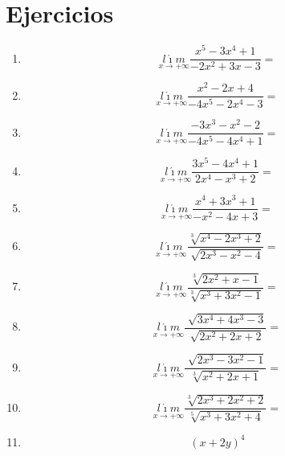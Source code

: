 \documentclass[oneside,spanish,letter]{article}
\begin{document}
\section{Ejercicios}
\begin{enumerate}
 \item $$\underset{x\rightarrow +\infty}{l\acute{\imath}m} \frac{x^5-3x^4+1}{-2x^2+3x-3}=$$
 \item $$\underset{x\rightarrow +\infty}{l\acute{\imath}m} \frac{x^2-2x+4}{-4x^5-2x^4-3}=$$
 \item $$\underset{x\rightarrow +\infty}{l\acute{\imath}m} \frac{-3x^3-x^2-2}{-4x^5-4x^4+1}=$$
 \item $$\underset{x\rightarrow +\infty}{l\acute{\imath}m} \frac{3x^5-4x^4+1}{2x^4-x^3+2}=$$
 \item $$\underset{x\rightarrow +\infty}{l\acute{\imath}m} \frac{x^4+3x^3+1}{-x^2-4x+3}=$$
 \item $$\underset{x\rightarrow +\infty}{l\acute{\imath}m} \frac{\sqrt[3]{x^4-2x^3+2}}{\sqrt[]{2x^3-x^2-4}}=$$
 \item $$\underset{x\rightarrow +\infty}{l\acute{\imath}m} \frac{\sqrt[3]{2x^2+x-1}}{\sqrt[3]{x^3+3x^2-1}}=$$
 \item $$\underset{x\rightarrow +\infty}{l\acute{\imath}m} \frac{\sqrt[]{3x^4+4x^3-3}}{\sqrt[]{2x^2+2x+2}}=$$
 \item $$\underset{x\rightarrow +\infty}{l\acute{\imath}m} \frac{\sqrt[]{2x^3-3x^2-1}}{\sqrt[3]{x^2+2x+1}}=$$
 \item $$\underset{x\rightarrow +\infty}{l\acute{\imath}m} \frac{\sqrt[3]{2x^3+2x^2+2}}{\sqrt[5]{x^3+3x^2+4}}=$$
\item $$(x+2y)^4$$
 \end{enumerate}
  \newpage
\end{document}
